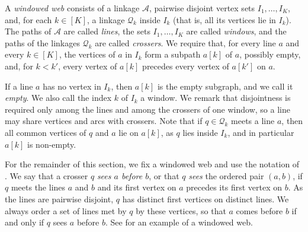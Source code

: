 \documentclass[fontsize=12pt,leading=14pt]{fullpaper}
\newcommand{\Acal}{\mathcal{A}}
\newcommand{\Qcal}{\mathcal{Q}}
\begin{document}
\begin{definition}\label{def:windowed}
  A \emph{windowed web} consists of a linkage $\Acal$, pairwise disjoint vertex sets $I_1,\dots,I_K$, and, for each $k\in[K]$, a linkage $\Qcal_k$ inside $I_k$ (that is, all its vertices lie in $I_k$).
  The paths of $\Acal$ are called \emph{lines}, the sets $I_1,\dots,I_K$ are called \emph{windows}, and the paths of the linkages $\Qcal_k$ are called \emph{crossers}.
  We require that, for every line $a$ and every $k\in[K]$, the vertices of $a$ in $I_k$ form a subpath $a[k]$ of $a$, possibly empty, and, for $k<k'$, every vertex of $a[k]$ precedes every vertex of $a[k']$ on $a$.
\end{definition}

If a line $a$ has no vertex in $I_k$, then $a[k]$ is the empty subgraph, and we call it \emph{empty}.
We also call the index $k$ of $I_k$ a window.
We remark that disjointness is required only among the lines and among the crossers of one window, so a line may share vertices and arcs with crossers.
Note that if $q\in\Qcal_k$ meets a line $a$, then all common vertices of $q$ and $a$ lie on $a[k]$, as $q$ lies inside $I_k$, and in particular $a[k]$ is non-empty.

For the remainder of this section, we fix a windowed web and use the notation of .
We say that a crosser $q$ \emph{sees $a$ before $b$}, or that $q$ \emph{sees} the ordered pair $(a,b)$, if $q$ meets the lines $a$ and $b$ and its first vertex on $a$ precedes its first vertex on $b$.
As the lines are pairwise disjoint, $q$ has distinct first vertices on distinct lines.
We always order a set of lines met by $q$ by these vertices, so that $a$ comes before $b$ if and only if $q$ sees $a$ before $b$.
See  for an example of a windowed web.
\end{document}

